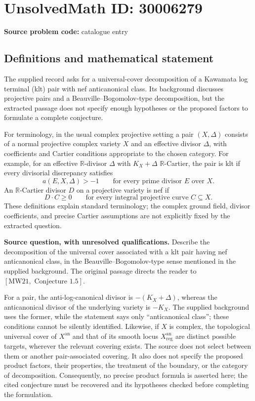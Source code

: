 \documentclass[11pt]{article}
\newcommand{\R}{\mathbb{R}}
\begin{document}
\section*{UnsolvedMath ID: 30006279}
\textbf{Source problem code:} catalogue entry
\subsection{Definitions and mathematical statement}
The supplied record asks for a universal-cover decomposition of a Kawamata log terminal (klt) pair with nef anticanonical class. Its background discusses projective pairs and a Beauville--Bogomolov-type decomposition, but the extracted passage does not specify enough hypotheses or the proposed factors to formulate a complete conjecture.

For terminology, in the usual complex projective setting a pair \((X,\Delta)\) consists of a normal projective complex variety \(X\) and an effective divisor \(\Delta\), with coefficients and Cartier conditions appropriate to the chosen category. For example, for an effective \(\R\)-divisor \(\Delta\) with \(K_X+\Delta\) \(\R\)-Cartier, the pair is klt if every divisorial discrepancy satisfies
\[
a(E,X,\Delta)>-1
\qquad\text{for every prime divisor }E\text{ over }X.
\]
An \(\R\)-Cartier divisor \(D\) on a projective variety is nef if
\[
D\cdot C\geq 0
\qquad\text{for every integral projective curve }C\subseteq X.
\]
These definitions explain standard terminology; the complex ground field, divisor coefficients, and precise Cartier assumptions are not explicitly fixed by the extracted question.

\textbf{Source question, with unresolved qualifications.} Describe the decomposition of the universal cover associated with a klt pair having nef anticanonical class, in the Beauville--Bogomolov-type sense mentioned in the supplied background. The original passage directs the reader to \([\mathrm{MW21},\text{ Conjecture }1.5]\).

For a pair, the anti-log-canonical divisor is \(-(K_X+\Delta)\), whereas the anticanonical divisor of the underlying variety is \(-K_X\). The supplied background uses the former, while the statement says only ``anticanonical class''; these conditions cannot be silently identified. Likewise, if \(X\) is complex, the topological universal cover of \(X^{\mathrm{an}}\) and that of its smooth locus \(X_{\mathrm{reg}}^{\mathrm{an}}\) are distinct possible targets, wherever the relevant covering exists. The source does not select between them or another pair-associated covering. It also does not specify the proposed product factors, their properties, the treatment of the boundary, or the category of decomposition. Consequently, no precise product formula is asserted here; the cited conjecture must be recovered and its hypotheses checked before completing the formulation.
\end{document}
